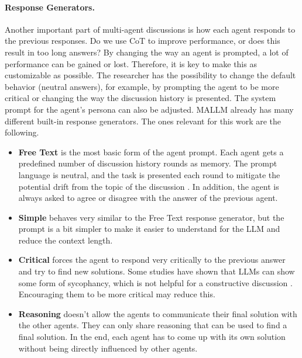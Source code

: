 \paragraph{Response Generators.}
Another important part of multi-agent discussions is how each agent responds to the previous responses. Do we use \ac{CoT} to improve performance, or does this result in too long answers? By changing the way an agent is prompted, a lot of performance can be gained or lost. Therefore, it is key to make this as customizable as possible. The researcher has the possibility to change the default behavior (neutral answers), for example, by prompting the agent to be more critical or changing the way the discussion history is presented. The system prompt for the agent's persona can also be adjusted. \ac{MALLM} already has many different built-in response generators. The ones relevant for this work are the following.
\begin{itemize}
    \item \textbf{Free Text} is the most basic form of the agent prompt. Each agent gets a predefined number of discussion history rounds as memory. The prompt language is neutral, and the task is presented each round to mitigate the potential drift from the topic of the discussion \citep{becker_multi-agent_2024}. In addition, the agent is always asked to agree or disagree with the answer of the previous agent.
    \item \textbf{Simple} behaves very similar to the Free Text response generator, but the prompt is a bit simpler to make it easier to understand for the \ac{LLM} and reduce the context length.
    \item \textbf{Critical} forces the agent to respond very critically to the previous answer and try to find new solutions. Some studies have shown that \acp{LLM} can show some form of sycophancy, which is not helpful for a constructive discussion \citep{sharma_towards_2023}. Encouraging them to be more critical may reduce this.
    \item \textbf{Reasoning} doesn't allow the agents to communicate their final solution with the other agents. They can only share reasoning that can be used to find a final solution. In the end, each agent has to come up with its own solution without being directly influenced by other agents.
\end{itemize}
